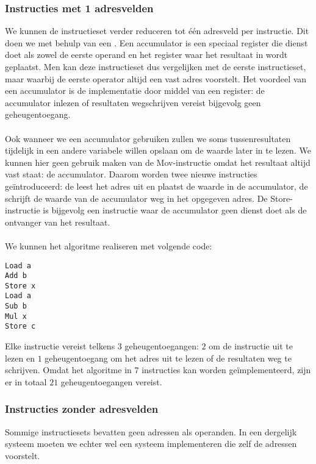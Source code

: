 \subsubsection{Instructies met 1 adresvelden}
We kunnen de instructieset verder reduceren tot \'e\'en adresveld per instructie. Dit doen we met behulp van een . Een accumulator is een speciaal register die dienst doet als zowel de eerste operand en het register waar het resultaat in wordt geplaatst. Men kan deze instructieset dus vergelijken met de eerste instructieset, maar waarbij de eerste operator altijd een vast adres voorstelt. Het voordeel van een accumulator is de implementatie door middel van een register: de accumulator inlezen of resultaten wegschrijven vereist bijgevolg geen geheugentoegang.
\paragraph{}
Ook wanneer we een accumulator gebruiken zullen we soms tussenresultaten tijdelijk in een andere variabele willen opslaan om de waarde later in te lezen. We kunnen hier geen gebruik maken van de Mov-instructie omdat het resultaat altijd vast staat: de accumulator. Daarom worden twee nieuwe instructies ge\"introduceerd: de  leest het adres uit en plaatst de waarde in de accumulator, de  schrijft de waarde van de accumulator weg in het opgegeven adres. De Store-instructie is bijgevolg een instructie waar de accumulator geen dienst doet als de ontvanger van het resultaat.
\paragraph{}
We kunnen het algoritme realiseren met volgende code:
\begin{verbatim}
Load a
Add b
Store x
Load a
Sub b
Mul x
Store c
\end{verbatim}
Elke instructie vereist telkens $3$ geheugentoegangen: $2$ om de instructie uit te lezen en $1$ geheugentoegang om het adres uit te lezen of de resultaten weg te schrijven. Omdat het algoritme in $7$ instructies kan worden ge\"implementeerd, zijn er in totaal $21$ geheugentoegangen vereist.
\subsubsection{Instructies zonder adresvelden}
Sommige instructiesets bevatten geen adressen als operanden. In een dergelijk systeem moeten we echter wel een systeem implementeren die zelf de adressen voorstelt.
